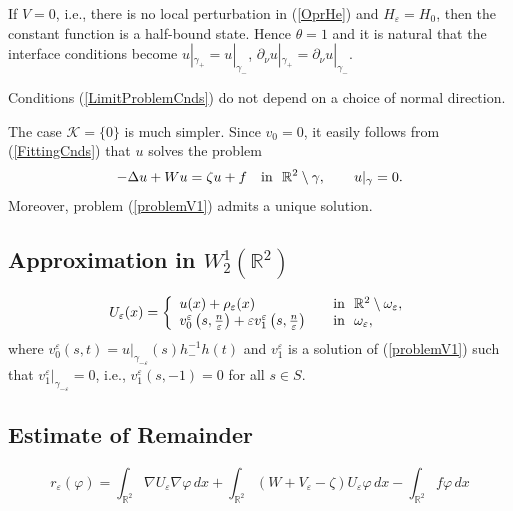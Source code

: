 \documentclass[graybox]{svmult}
\newcommand{\Real}{\mathbb R}
\newcommand{\eps}{\varepsilon}
\renewcommand{\phi}{\varphi}
\newcommand\nep{\textstyle\frac n\eps}
\newcommand{\eqref}[1]{(\ref{#1})}
\begin{document}
\begin{remark}
  If $V=0$, i.e., there is no local perturbation in \eqref{OprHe} and $H_\eps=H_0$, then the constant function is a half-bound state. Hence $\theta=1$ and it is natural that the interface conditions become
$u|_{\gamma_+}= u|_{\gamma_-}$, $\partial_\nu u|_{\gamma_+}=\partial_\nu u|_{\gamma_-}$.
\end{remark}
\begin{remark}
  Conditions \eqref{LimitProblemCnds} do not depend on a choice of normal direction.
\end{remark}


The case $\mathcal{K}=\{0\}$ is much simpler.  Since $v_0=0$, it easily follows from \eqref{FittingCnds} that $u$ solves the problem
\begin{equation}
-\Delta u+Wu=\zeta u+f \quad \hbox{in \ } \Real^2\setminus \gamma,\qquad
 u|_{\gamma}=0.
\end{equation}
Moreover, problem \eqref{problemV1} admits a unique solution.





\subsection{Approximation in $W_2^1(\Real^2)$}


\begin{equation}\label{AsymptoticsUe}
U_\eps(x)=
\left\{
  \begin{array}{ll}
    u(x)+\rho_\eps(x)&\quad \hbox{in \ }\Real^2\setminus \omega_\eps, \\
    v_0^\eps\left(s,\nep\right)+\eps v_1^\eps\left(s,\nep\right)
&\quad \hbox{in \ } \omega_\eps,
  \end{array}
\right.
\end{equation}
where $v_0^\eps\left(s,t\right)=u|_{\gamma_{-\eps}}(s)h_-^{-1}h(t)$
and $v_1^\eps$ is a solution of \eqref{problemV1} such that
$v_1^\eps|_{\gamma_{-\eps}}=0$, i.e., $v_1^\eps(s,-1)=0$ for all $s\in S$.











\subsection{Estimate of Remainder}


$$
r_\eps(\phi)=\int_{\Real^2}\nabla U_\eps \nabla \phi\,dx+
             \int_{\Real^2} (W+V_\eps-\zeta)U_\eps \phi\,dx
            -   \int_{\Real^2}f\phi\,dx
$$
\end{document}

